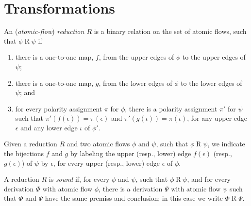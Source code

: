 \chapter{Transformations}



\begin{definition}\label{definition:FlowReduction}
An (\emph{atomic-flow}) \emph{reduction $R$} is a binary relation on the set of atomic flows, such that $\phi\mathrel{R}\psi$ if
\begin{enumerate}
\item
there is a one-to-one map, $f$, from the upper edges of $\phi$ to the upper edges of $\psi$;
\item
there is a one-to-one map, $g$, from the lower edges of $\phi$ to the lower edges of $\psi$; and
\item\label{definition:FlowReduction:item:Polarity}
for every polarity assignment $\pi$ for $\phi$, there is a polarity assignment $\pi'$ for $\psi$ such that $\pi'(f(\epsilon))=\pi(\epsilon)$ and $\pi'(g(\iota))=\pi(\iota)$, for any upper edge $\epsilon$ and any lower edge $\iota$ of $\phi'$.
\end{enumerate}
\end{definition}

\begin{remark}\label{remark:LabelBijectionEdges}
Given a reduction $R$ and two atomic flows $\phi$ and $\psi$, such that $\phi\mathrel{R}\psi$, we indicate the bijections $f$ and $g$ by labeling the upper (resp., lower) edge $f(\epsilon)$ (resp., $g(\epsilon)$) of $\psi$ by $\epsilon$, for every upper (resp., lower) edge $\epsilon$ of $\phi$.
\end{remark}


\begin{definition}\label{definition:SoundRedcution}
A reduction $R$ is \emph{sound} if, for every $\phi$ and $\psi$, such that $\phi\mathrel{R}\psi$, and for every derivation $\Phi$ with atomic flow $\phi$, there is a derivation $\Psi$ with atomic flow $\psi$ such that $\Phi$ and $\Psi$ have the same premiss and conclusion; in this case we write $\Phi\mathrel{R}\Psi$.
\end{definition}


